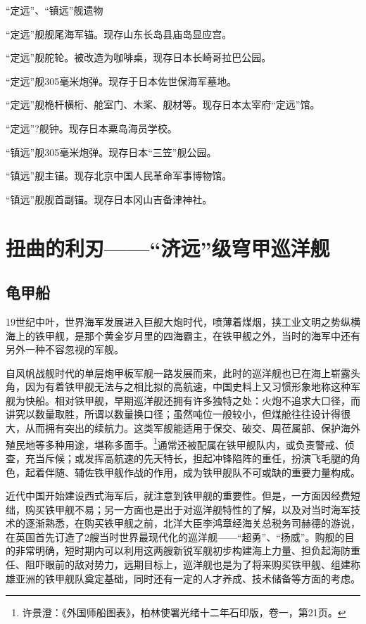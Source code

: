 \documentclass[12pt,UTF8]{ctexbook}
\begin{document}
“定远”、“镇远”舰遗物

“定远”舰舰尾海军锚。现存山东长岛县庙岛显应宫。

“定远”舰舵轮。被改造为咖啡桌，现存日本长崎哥拉巴公园。

“定远”舰305毫米炮弹。现存于日本佐世保海军墓地。

“定远”舰桅杆横桁、舱室门、木桨、舰材等。现存日本太宰府“定远”馆。

“定远”?舰钟。现存日本粟岛海员学校。

“镇远”舰305毫米炮弹。现存日本“三笠”舰公园。

“镇远”舰主锚。现存北京中国人民革命军事博物馆。

“镇远”舰舰首副锚。现存日本冈山吉备津神社。

\chapter{扭曲的利刃——“济远”级穹甲巡洋舰}

\section{龟甲船}

19世纪中叶，世界海军发展进入巨舰大炮时代，喷薄着煤烟，挟工业文明之势纵横海上的铁甲舰，是那个黄金岁月里的四海霸主，在铁甲舰之外，当时的海军中还有另外一种不容忽视的军舰。

自风帆战舰时代的单层炮甲板军舰一路发展而来，此时的巡洋舰也已在海上崭露头角，因为有着铁甲舰无法与之相比拟的高航速，中国史料上又习惯形象地称这种军舰为快船。相对铁甲舰，早期巡洋舰还拥有许多独特之处：火炮不追求大口径，而讲究以数量取胜，所谓以数量换口径；虽然吨位一般较小，但煤舱往往设计得很大，从而拥有突出的续航力。这类军舰能适用于保交、破交、周莅属部、保护海外殖民地等多种用途，堪称多面手。\footnote{许景澄：《外国师船图表》，柏林使署光绪十二年石印版，卷一，第21页。}通常还被配属在铁甲舰队内，或负责警戒、侦查，充当斥候；或发挥高航速的先天特长，担起冲锋陷阵的重任，扮演飞毛腿的角色，起着伴随、辅佐铁甲舰作战的作用，成为铁甲舰队不可或缺的重要力量构成。

近代中国开始建设西式海军后，就注意到铁甲舰的重要性。但是，一方面因经费短绌，购买铁甲舰不易；另一方面也是出于对巡洋舰特性的了解，以及对当时海军技术的逐渐熟悉，在购买铁甲舰之前，北洋大臣李鸿章经海关总税务司赫德的游说，在英国首先订造了2艘当时世界最现代化的巡洋舰——“超勇”、“扬威”。购舰的目的非常明确，短时期内可以利用这两艘新锐军舰初步构建海上力量、担负起海防重任、阻吓眼前的敌对势力，远期目标上，巡洋舰也是为了将来购买铁甲舰、组建称雄亚洲的铁甲舰队奠定基础，同时还有一定的人才养成、技术储备等方面的考虑。
\end{document}
